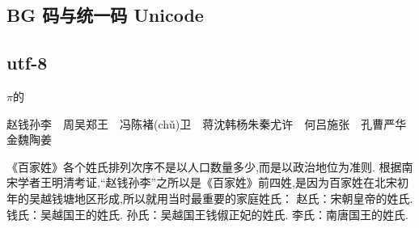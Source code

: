 
\subsection{BG 码与统一码 Unicode}

\subsection{utf-8}


$\pi$的


赵钱孙李　周吴郑王　冯陈褚(chǔ)卫　蒋沈韩杨朱秦尤许　何吕施张　孔曹严华　金魏陶姜

《百家姓》各个姓氏排列次序不是以人口数量多少,而是以政治地位为准则.
根据南宋学者王明清考证,“赵钱孙李”之所以是《百家姓》前四姓,是因为百家姓在北宋初年的吴越钱塘地区形成,所以就用当时最重要的家庭姓氏：
赵氏：宋朝皇帝的姓氏.
钱氏：吴越国王的姓氏.
孙氏：吴越国王钱俶正妃的姓氏.
李氏：南唐国王的姓氏.




